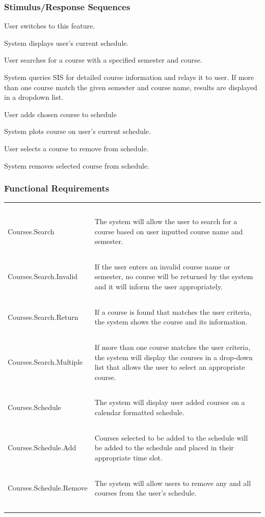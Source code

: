 \documentclass[pdftex,12pt,letter]{article}
\begin{document}
\subsubsection{Stimulus/Response Sequences}
\begin{description}\itemsep1pt
\item[Stimulus:] User switches to this feature.
\item[Response:] System displays user's current schedule.
\item[Stimulus:] User searches for a course with a specified semester and course.
\item[Response:] System queries SIS for detailed course information and relays it to user. If more than one course match the given semester and course name, results are displayed in a dropdown list.
\item[Stimulus:] User adds chosen course to schedule
\item[Response:] System plots course on user's current schedule.
\item[Stimulus:] User selects a course to remove from schedule.
\item[Response:] System removes selected course from schedule.
\end{description}
\subsubsection{Functional Requirements}
\begin{table}[!h]
\begin{tabularx}{\textwidth }[t]{|l Y|}
\hline
~&~\\
Courses.Search & The system will allow the user to search for a course based on user inputted course name and semester.\\ 
~&~\\
Courses.Search.Invalid & If the user enters an invalid course name or semester, no course will be returned by the system and it will inform the user appropriately.\\
~&~\\
Courses.Search.Return & If a course is found that matches the user criteria, the system shows the course and its information. \\
~&~\\
Courses.Search.Multiple & If more than one course matches the user criteria, the system will display the courses in a drop-down list that allows the user to select an appropriate course.\\
~&~\\
Courses.Schedule & The system will display user added courses on a calendar formatted schedule.\\
~&~\\
Courses.Schedule.Add & Courses selected to be added to the schedule will be added to the schedule and placed in their appropriate time slot.\\
~&~\\
Courses.Schedule.Remove & The system will allow users to remove any and all courses from the user's schedule.\\
~&~\\
\hline
\end{tabularx}
\end{table}
\FloatBarrier
\end{document}
